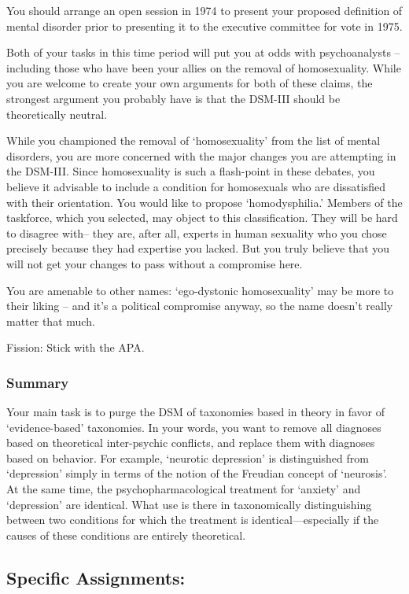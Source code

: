 You should arrange an open session in 1974 to present your proposed definition of mental disorder prior to presenting it to the executive committee for vote in 1975.

Both of your tasks in this time period will put you at odds with psychoanalysts – including those who have been your allies on the removal of homosexuality. While you are welcome to create your own arguments for both of these claims, the strongest argument you probably have is that the DSM-III should be theoretically neutral. 

While you championed the removal of `homosexuality' from the list of mental disorders, you are more concerned with the major changes you are attempting in the DSM-III. Since homosexuality is such a flash-point in these debates, you believe it advisable to include a condition for homosexuals who are dissatisfied with their orientation. You would like to propose `homodysphilia.' Members of the taskforce, which you selected, may object to this classification. They will be hard to disagree with-- they are, after all, experts in human sexuality who you chose precisely because they had expertise you lacked. But you truly believe that you will not get your changes to pass without a compromise here.

You are amenable to other names: `ego-dystonic homosexuality' may be more to their liking – and it's a political compromise anyway, so the name doesn't really matter that much.

Fission: Stick with the APA.

\subsubsection{Summary}
\label{summary}

Your main task is to purge the DSM of taxonomies based in theory in favor of `evidence-based' taxonomies. In your words, you want to remove all diagnoses based on theoretical inter-psychic conflicts, and replace them with diagnoses based on behavior. For example, `neurotic depression' is distinguished from `depression' simply in terms of the notion of the Freudian concept of `neurosis'. At the same time, the psychopharmacological treatment for `anxiety' and `depression' are identical. What use is there in taxonomically distinguishing between two conditions for which the treatment is identical---especially if the causes of these conditions are entirely theoretical.

\subsection{Specific Assignments:}
\label{specificassignments:}

